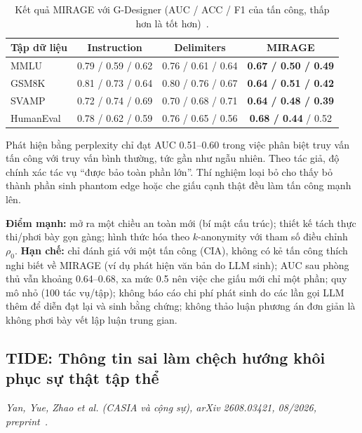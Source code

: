 \begin{table}[!htbp]
\centering
\small
\caption{Kết quả MIRAGE với G-Designer (AUC / ACC / F1 của tấn công, thấp hơn là tốt hơn)~\cite{p1mirage}.}
\label{tab:mirage}
\begin{tabular}{lccc}
\toprule
\textbf{Tập dữ liệu} & \textbf{Instruction} & \textbf{Delimiters} & \textbf{MIRAGE} \\
\midrule
MMLU      & 0.79 / 0.59 / 0.62 & 0.76 / 0.61 / 0.64 & \textbf{0.67 / 0.50 / 0.49} \\
GSM8K     & 0.81 / 0.73 / 0.64 & 0.80 / 0.76 / 0.67 & \textbf{0.64 / 0.51 / 0.42} \\
SVAMP     & 0.72 / 0.74 / 0.69 & 0.70 / 0.68 / 0.71 & \textbf{0.64 / 0.48 / 0.39} \\
HumanEval & 0.78 / 0.62 / 0.59 & 0.76 / 0.65 / 0.56 & \textbf{0.68 / 0.44} / 0.52 \\
\bottomrule
\end{tabular}
\end{table}

Phát hiện bằng perplexity chỉ đạt AUC 0.51--0.60 trong việc phân biệt truy vấn tấn công với truy vấn bình thường, tức gần như ngẫu nhiên. Theo tác giả, độ chính xác tác vụ ``được bảo toàn phần lớn''. Thí nghiệm loại bỏ cho thấy bỏ thành phần sinh phantom edge hoặc che giấu cạnh thật đều làm tấn công mạnh lên.

\begin{nhanxet}
\textbf{Điểm mạnh:} mở ra một chiều an toàn mới (bí mật cấu trúc); thiết kế tách thực thi/phơi bày gọn gàng; hình thức hóa theo $k$-anonymity với tham số điều chỉnh $\rho_0$. \textbf{Hạn chế:} chỉ đánh giá với một tấn công (CIA), không có kẻ tấn công thích nghi biết về MIRAGE (ví dụ phát hiện văn bản do LLM sinh); AUC sau phòng thủ vẫn khoảng 0.64--0.68, xa mức 0.5 nên việc che giấu mới chỉ một phần; quy mô nhỏ (100 tác vụ/tập); không báo cáo chi phí phát sinh do các lần gọi LLM thêm để diễn đạt lại và sinh bằng chứng; không thảo luận phương án đơn giản là không phơi bày vết lập luận trung gian.
\end{nhanxet}

\subsection{TIDE: Thông tin sai làm chệch hướng khôi phục sự thật tập thể}
\label{sec:tide}

\noindent\textit{Yan, Yue, Zhao et al. (CASIA và cộng sự), arXiv 2608.03421, 08/2026, preprint~\cite{p4tide}.}

